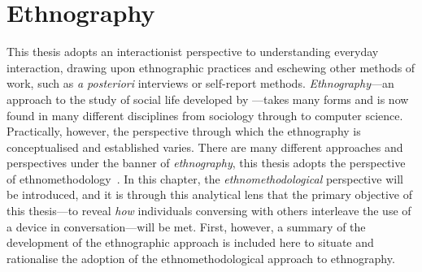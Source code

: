 \section{Ethnography}\label{sec:background approach ethnography}
\begin{revisedsubmission}
This thesis adopts an interactionist perspective to understanding everyday interaction, drawing upon ethnographic practices and eschewing other methods of work, such as \textit{a posteriori} interviews or self-report methods.
\textit{Ethnography}---an approach to the study of social life developed by \citet{Malinowski1922}---takes many forms and is now found in many different disciplines from sociology through to computer science.
Practically, however, the perspective through which the ethnography is conceptualised and established varies.
There are many different approaches and perspectives under the banner of \textit{ethnography}, this thesis adopts the perspective of ethnomethodology~\citep{Garfinkel1967}.
In this chapter, the \textit{ethnomethodological} perspective will be introduced, and it is through this analytical lens that the primary objective of this thesis---to reveal \textit{how} individuals conversing with others interleave the use of a device in conversation---will be met.
First, however, a summary of the development of the ethnographic approach is included here to situate and rationalise the adoption of the ethnomethodological approach to ethnography.


\end{revisedsubmission}
